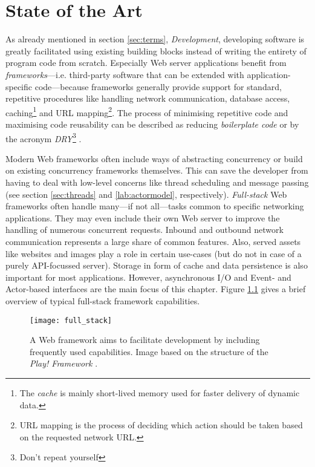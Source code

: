\chapter{State of the Art}
\label{lab:sota}
As already mentioned in section \ref{sec:terms}, \textit{Development}, developing software is greatly facilitated using existing building blocks instead of writing the entirety of program code from scratch. Especially Web server applications benefit from \textit{frameworks}---i.e. third-party software that can be extended with application-specific code---because frameworks generally provide support for standard, repetitive procedures like handling network communication, database access, caching\footnote{The \textit{cache} is mainly short-lived memory used for faster delivery of dynamic data.} and URL mapping\footnote{URL mapping is the process of deciding which action should be taken based on the requested network URL.}. The process of minimising repetitive code and maximising code reusability can be described as reducing \textit{boilerplate code} or by the acronym \textit{DRY}\footnote{Don't repeat yourself} \cite[p. 149]{Scala} \cite[p. 1]{Orsini2008}.

Modern Web frameworks often include ways of abstracting concurrency or build on existing concurrency frameworks themselves. This can save the developer from having to deal with low-level concerns like thread scheduling and message passing (see section \ref{sec:threads} and \ref{lab:actormodel}, respectively). \textit{Full-stack} Web frameworks often handle many---if not all---tasks common to specific networking applications. They may even include their own Web server to improve the handling of numerous concurrent requests. Inbound and outbound network communication represents a large share of common features. Also, served assets like websites and images play a role in certain use-cases (but do not in case of a purely API-focussed server). Storage in form of cache and data persistence is also important for most applications. However, asynchronous I/O and Event- and Actor-based interfaces are the main focus of this chapter. Figure \ref{fig:full_stack} gives a brief overview of typical full-stack framework capabilities.

\begin{figure}
\centering\small
\setlength{\tabcolsep}{0mm}
  \texttt{[image: full\_stack]}
\caption{
A Web framework aims to facilitate development by including frequently used capabilities. Image based on the structure of the \textit{Play! Framework} \cite{Scala}.
}
\label{fig:full_stack}
\end{figure}

